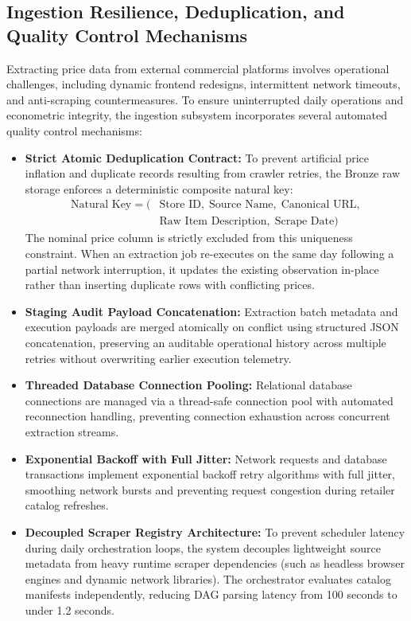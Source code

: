 \subsection{Ingestion Resilience, Deduplication, and Quality Control Mechanisms}
\hs Extracting price data from external commercial platforms involves operational challenges, including dynamic frontend redesigns, intermittent network timeouts, and anti-scraping countermeasures. To ensure uninterrupted daily operations and econometric integrity, the ingestion subsystem incorporates several automated quality control mechanisms:
\begin{itemize}
    \item \textbf{Strict Atomic Deduplication Contract:} To prevent artificial price inflation and duplicate records resulting from crawler retries, the Bronze raw storage enforces a deterministic composite natural key:
    \begin{equation}
    \begin{split}
        \text{Natural Key} = \Big(&\text{Store ID}, \; \text{Source Name}, \; \text{Canonical URL}, \\
        &\text{Raw Item Description}, \; \text{Scrape Date}\Big)
    \end{split}
    \end{equation}
    The nominal price column is strictly excluded from this uniqueness constraint. When an extraction job re-executes on the same day following a partial network interruption, it updates the existing observation in-place rather than inserting duplicate rows with conflicting prices.
    \item \textbf{Staging Audit Payload Concatenation:} Extraction batch metadata and execution payloads are merged atomically on conflict using structured JSON concatenation, preserving an auditable operational history across multiple retries without overwriting earlier execution telemetry.
    \item \textbf{Threaded Database Connection Pooling:} Relational database connections are managed via a thread-safe connection pool with automated reconnection handling, preventing connection exhaustion across concurrent extraction streams.
    \item \textbf{Exponential Backoff with Full Jitter:} Network requests and database transactions implement exponential backoff retry algorithms with full jitter, smoothing network bursts and preventing request congestion during retailer catalog refreshes.
    \item \textbf{Decoupled Scraper Registry Architecture:} To prevent scheduler latency during daily orchestration loops, the system decouples lightweight source metadata from heavy runtime scraper dependencies (such as headless browser engines and dynamic network libraries). The orchestrator evaluates catalog manifests independently, reducing DAG parsing latency from 100 seconds to under 1.2 seconds.

\end{itemize}
